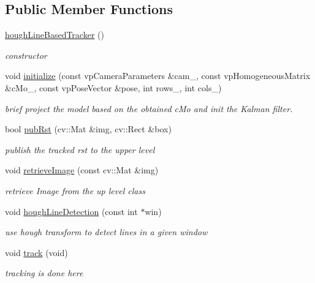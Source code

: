 \subsection*{\-Public \-Member \-Functions}
\begin{DoxyCompactItemize}
\item 
\hyperlink{classhoughLineBasedTracker_a8486c3de3d20d8ca17d5afa5d13c27dc}{hough\-Line\-Based\-Tracker} ()
\begin{DoxyCompactList}\small\item\em constructor \end{DoxyCompactList}\item 
void \hyperlink{classhoughLineBasedTracker_a7a9281df256344be5c9afab200aae2e1}{initialize} (const vp\-Camera\-Parameters \&cam\-\_\-, const vp\-Homogeneous\-Matrix \&c\-Mo\-\_\-, const vp\-Pose\-Vector \&pose, int rows\-\_\-, int cols\-\_\-)
\begin{DoxyCompactList}\small\item\em brief project the model based on the obtained c\-Mo and init the \-Kalman filter. \end{DoxyCompactList}\item 
bool \hyperlink{classhoughLineBasedTracker_afb860ab5cf96382106661db117e929ea}{pub\-Rst} (cv\-::\-Mat \&img, cv\-::\-Rect \&box)
\begin{DoxyCompactList}\small\item\em publish the tracked rst to the upper level \end{DoxyCompactList}\item 
void \hyperlink{classhoughLineBasedTracker_aefcf18fa7251a151e4fd72355886bd4c}{retrieve\-Image} (const cv\-::\-Mat \&img)
\begin{DoxyCompactList}\small\item\em retrieve \-Image from the up level class \end{DoxyCompactList}\item 
void \hyperlink{classhoughLineBasedTracker_a4a61b01d41927fe3db6019484bd02a7b}{hough\-Line\-Detection} (const int $\ast$win)
\begin{DoxyCompactList}\small\item\em use hough transform to detect lines in a given window \end{DoxyCompactList}\item 
void \hyperlink{classhoughLineBasedTracker_a6dd7025c8965e34b9bf15601c3783195}{track} (void)
\begin{DoxyCompactList}\small\item\em tracking is done here \end{DoxyCompactList}\item 

\end{DoxyCompactItemize}

